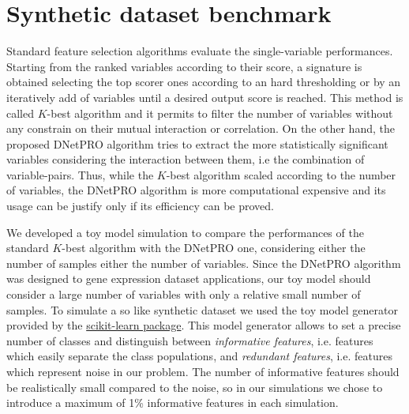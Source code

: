 \documentclass{standalone}
\begin{document}
\section[Toy Model]{Synthetic dataset benchmark}\label{dnetpro:toy}

Standard feature selection algorithms evaluate the single-variable performances.
Starting from the ranked variables according to their score, a signature is obtained selecting the top scorer ones according to an hard thresholding or by an iteratively add of variables until a desired output score is reached.
This method is called $K$-best algorithm and it permits to filter the number of variables without any constrain on their mutual interaction or correlation.
On the other hand, the proposed DNetPRO algorithm tries to extract the more statistically significant variables considering the interaction between them, i.e the combination of variable-pairs.
Thus, while the $K$-best algorithm scaled according to the number of variables, the DNetPRO algorithm is more computational expensive and its usage can be justify only if its efficiency can be proved.

We developed a toy model simulation to compare the performances of the standard $K$-best algorithm with the DNetPRO one, considering either the number of samples either the number of variables.
Since the DNetPRO algorithm was designed to gene expression dataset applications, our toy model should consider a large number of variables with only a relative small number of samples.
To simulate a so like synthetic dataset we used the toy model generator provided by the \href{https://scikit-learn.org/stable/modules/generated/sklearn.datasets.make_classification.html}{scikit-learn package}.
This model generator allows to set a precise number of classes and distinguish between \emph{informative features}, i.e. features which easily separate the class populations, and \emph{redundant features}, i.e. features which represent noise in our problem.
The number of informative features should be realistically small compared to the noise, so in our simulations we chose to introduce a maximum of 1\% informative features in each simulation.
\end{document}
